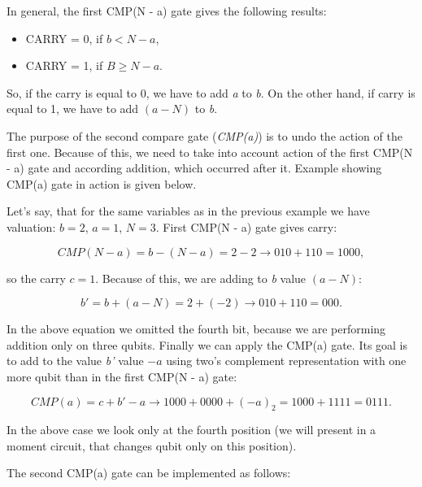In general, the first CMP(N - a) gate gives the following results:

\begin{itemize}
    \item CARRY = 0, if $b < N - a$,
    \item CARRY = 1, if $B \geq N - a$.
\end{itemize}

So, if the carry is equal to 0, we have to add \textit{a} to \textit{b}. On the other hand, if carry is equal to 1, we have to add $(a - N)$ to \textit{b}.

The purpose of the second compare gate (\textit{CMP(a)}) is to undo the action of the first one. Because of this, we need to take into account action of the first CMP(N - a) gate and according addition, which occurred after it. Example showing CMP(a) gate in action is given below.

\begin{example}
Let's say, that for the same variables as in the previous example we have valuation: $b = 2$, $a = 1$, $N = 3$. First CMP(N - a) gate gives carry:

\[ CMP(N - a) = b - (N - a) = 2 - 2 \rightarrow 010 + 110 = 1000, \]

so the carry $c = 1$. Because of this, we are adding to \textit{b} value $(a - N)$:

\[ b' = b + (a - N) = 2 + (-2) \rightarrow 010 + 110 = 000.\]

In the above equation we omitted the fourth bit, because we are performing addition only on three qubits. Finally we can apply the CMP(a) gate. Its goal is to add to the value \textit{b'} value $-a$ using two's complement representation with one more qubit than in the first CMP(N - a) gate:

\[ CMP(a) = c + b' - a \rightarrow 1000 + 0000 + (-a)_2 = 1000 + 1111 = 0111.\]

In the above case we look only at the fourth position (we will present in a moment circuit, that changes qubit only on this position).
\end{example}

The second CMP(a) gate can be implemented as follows:

